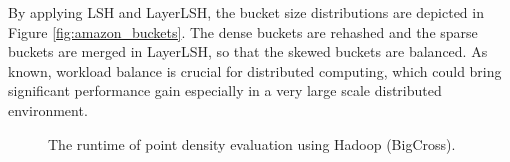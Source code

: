 By applying LSH and LayerLSH, the bucket size distributions are depicted in Figure \ref{fig:amazon_buckets}. The dense buckets are rehashed and the sparse buckets are merged in LayerLSH, so that the skewed buckets are balanced. As known, workload balance is crucial for distributed computing, which could bring significant performance gain especially in a very large scale distributed environment.

\begin{figure}[t]
	\centerline{
    \hspace{-5mm}
    }
	\caption{The runtime of point density evaluation using Hadoop (BigCross).}
	\label{fig:amazon}
\end{figure}

